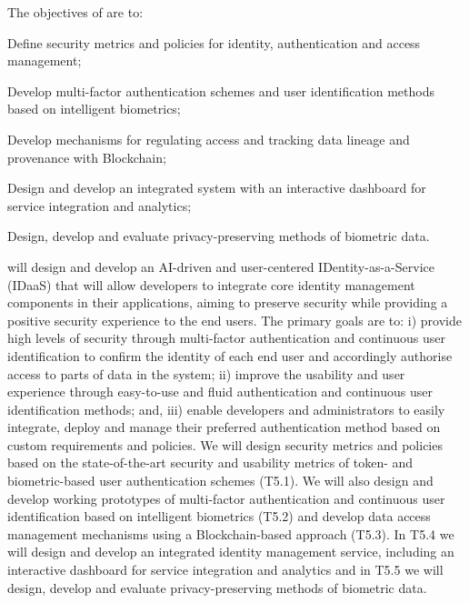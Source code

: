 \addtocounter{wpno}{1}
\begin{Workpackage}{\thewpno}
\WPTitle{\wpname{\thewpno}}

\begin{WPObjectives}
The objectives of \theWP{} are to:
\begin{compactitem}
\item Define security metrics and policies for identity, authentication and access management;
\item Develop multi-factor authentication schemes and %
user identification methods based on intelligent biometrics;
\item Develop mechanisms for regulating access and tracking data lineage and provenance with Blockchain;
\item Design and develop an integrated system with an interactive dashboard for service integration and analytics;
\item Design, develop and evaluate privacy-preserving methods of biometric data.
\end{compactitem}
\end{WPObjectives}

\begin{WPDescription}
\theWP{} will design and develop an AI-driven and user-centered IDentity-as-a-Service (IDaaS) that will allow developers to integrate core identity management components in their applications, aiming to preserve security while providing a positive security experience to the end users. The primary goals are to: i) provide high levels of security through multi-factor authentication and continuous user identification to confirm the identity of each end user and accordingly authorise access to parts of data in the system; ii) improve the usability and user experience through easy-to-use and fluid authentication and continuous user identification methods; and, iii) enable developers and administrators to easily integrate, deploy and manage their preferred authentication method based on custom requirements and policies. We will design security metrics and policies based on the state-of-the-art security and usability metrics of token- and biometric-based user authentication schemes (T5.1). We will also design and develop working prototypes of multi-factor authentication and continuous user identification based on intelligent biometrics (T5.2) and develop data access management mechanisms using a Blockchain-based approach (T5.3). In T5.4 we will design and develop an integrated identity management service, including an interactive dashboard for service integration and analytics and in T5.5 we will design, develop and evaluate privacy-preserving methods of biometric data.


\end{WPDescription}
\end{Workpackage}
